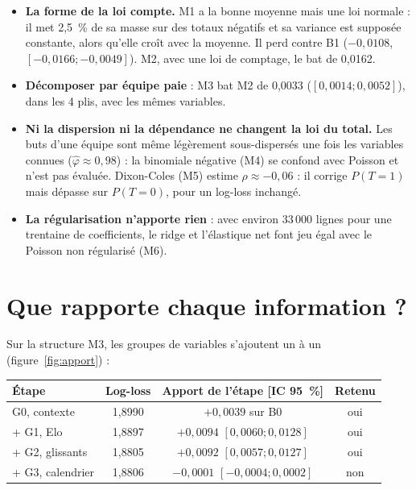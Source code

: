 \begin{itemize}
  \item \textbf{La forme de la loi compte.} M1 a la bonne moyenne mais une loi normale : il met 2,5~\%
        de sa masse sur des totaux négatifs et sa variance est supposée constante, alors qu'elle croît
        avec la moyenne. Il perd contre B1 (\(-0{,}0108\), \([-0{,}0166 ; -0{,}0049]\)). M2, avec une loi
        de comptage, le bat de 0,0162.
  \item \textbf{Décomposer par équipe paie} : M3 bat M2 de 0,0033 (\([0{,}0014 ; 0{,}0052]\)), dans les
        4 plis, avec les mêmes variables.
  \item \textbf{Ni la dispersion ni la dépendance ne changent la loi du total.} Les buts d'une équipe
        sont même légèrement sous-dispersés une fois les variables connues (\(\hat\varphi \approx
        0{,}98\)) : la binomiale négative (M4) se confond avec Poisson et n'est pas évaluée. Dixon-Coles
        (M5) estime \(\rho \approx -0{,}06\) : il corrige \(P(T = 1)\) mais dépasse sur \(P(T = 0)\), pour
        un log-loss inchangé.
  \item \textbf{La régularisation n'apporte rien} : avec environ 33\,000 lignes pour une trentaine de
        coefficients, le ridge et l'élastique net font jeu égal avec le Poisson non régularisé (M6).
\end{itemize}

\section{Que rapporte chaque information ?}

Sur la structure M3, les groupes de variables s'ajoutent un à un (figure~\ref{fig:apport}) :

\begin{center}
\begin{tabular}{lccc}
\toprule
Étape & Log-loss & Apport de l'étape [IC 95~\%] & Retenu \\
\midrule
G0, contexte & 1,8990 & \(+0{,}0039\) sur B0 & oui \\
+ G1, Elo & 1,8897 & \(+0{,}0094\) \([0{,}0060 ; 0{,}0128]\) & oui \\
+ G2, glissants & 1,8805 & \(+0{,}0092\) \([0{,}0057 ; 0{,}0127]\) & oui \\
+ G3, calendrier & 1,8806 & \(-0{,}0001\) \([-0{,}0004 ; 0{,}0002]\) & non \\
\bottomrule
\end{tabular}
\end{center}

